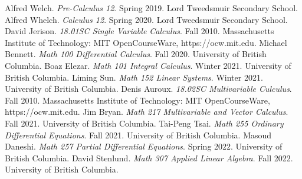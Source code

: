 \documentclass[11pt, fleqn]{article}
\begin{document}
\begin{thebibliography}{20}
 Alfred Welch. \textit{Pre-Calculus 12}. Spring 2019. Lord Tweedsmuir Secondary School.
 Alfred Whelch. \textit{Calculus 12}. Spring 2020. Lord Tweedsmuir Secondary School.
 David Jerison. \textit{18.01SC Single Variable Calculus}. Fall 2010. Massachusetts Institute of Technology: MIT OpenCourseWare, https://ocw.mit.edu.
 Michael Bennett. \textit{Math 100 Differential Calculus}. Fall 2020. University of British Columbia.
 Boaz Elezar. \textit{Math 101 Integral Calculus}. Winter 2021. University of British Columbia.
 Liming Sun. \textit{Math 152 Linear Systems}. Winter 2021. University of British Columbia.
 Denis Auroux. \textit{18.02SC Multivariable Culculus}. Fall 2010. Massachusetts Institute of Technology: MIT OpenCourseWare, https://ocw.mit.edu.
 Jim Bryan. \textit{Math 217 Multivariable and Vector Calculus}. Fall 2021. University of British Columbia.
 Tai-Peng Tsai. \textit{Math 255 Ordinary Differential Equations}. Fall 2021. University of British Columbia.
 Masoud Daneshi. \textit{Math 257 Partial Differential Equations}. Spring 2022. University of British Columbia.
 David Stenlund. \textit{Math 307 Applied Linear Algebra}. Fall 2022. University of British Columbia.
\end{thebibliography}
\end{document}
